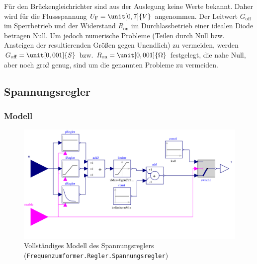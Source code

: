 Für den Brückengleichrichter sind aus der Auslegung keine Werte bekannt.
Daher wird für die Flussspannung \(U_{\mathrm{F}}=\unit[0,7]{V}\)
angenommen. Der Leitwert \(G_{\mathrm{off}}\) im Sperrbetrieb und der
Widerstand \(R_{\mathrm{on}}\) im Durchlassbetrieb einer idealen Diode
betragen Null. Um jedoch numerische Probleme (Teilen durch Null bzw.
Ansteigen der resultierenden Größen gegen Unendlich) zu vermeiden,
werden \(G_{\mathrm{off}}=\unit[0,001]{S}\) bzw.
\(R_{\mathrm{on}}=\unit[0,001]{\Omega}\) festgelegt, die nahe Null, aber
noch groß genug, sind um die genannten Probleme zu vermeiden.

\hypertarget{spannungsregler}{%
\subsection{Spannungsregler}\label{spannungsregler}}

\hypertarget{modell-3}{%
\subsubsection{Modell}\label{modell-3}}

\begin{figure}
\centering
\includegraphics{Bilder/Spannungsregler.pdf}
\caption{Vollständiges Modell des Spannungsreglers
(\texttt{Frequenzumformer.Regler.Spannungsregler})}
\end{figure}

